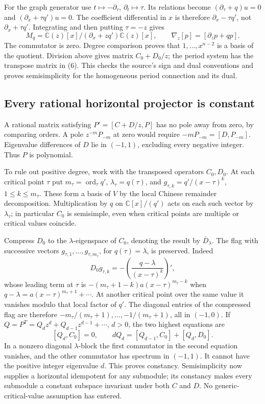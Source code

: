 \documentclass[11pt]{article}
\DeclareMathOperator{\ord}{ord}
\newcommand{\C}{\mathbb C}
\begin{document}
For the graph generator use $t\mapsto-\partial_\tau$,
$\partial_t\mapsto\tau$. Its relations become
$(\partial_\tau+q)u=0$ and $(\partial_x+\tau q')u=0$.
The coefficient differential in $x$ is therefore $\partial_x-\tau q'$,
not $\partial_x+\tau q'$. Integrating and then putting $\tau=-z$ gives
\[
 M_q=\C(z)[x]/(\partial_x+zq')\C(z)[x],\qquad
 \nabla_z[p]=[\partial_zp+qp].                              \tag{7}
\]
The commutator is zero. Degree comparison proves that $1,\ldots,x^{n-2}$
is a basis of the quotient. Division above gives matrix $C_0+D_0/z$;
the period system has the transpose matrix in (6). This checks the
source's sign and dual conventions and proves semisimplicity for the
homogeneous period connection and its dual.

\subsection{Every rational horizontal projector is constant}
A rational matrix satisfying $P'=[C+D/z,P]$ has no pole away from zero,
by comparing orders. A pole $z^{-m}P_{-m}$ at zero would require
$-mP_{-m}=[D,P_{-m}]$. Eigenvalue differences of $D$ lie in $(-1,1)$,
excluding every negative integer. Thus $P$ is polynomial.

To rule out positive degree, work with the transposed operators $C_0,D_0$.
At each critical point $\tau$ put $m_\tau=\ord_\tau q'$,
$\lambda_\tau=q(\tau)$, and $g_{\tau,k}=q'/(x-\tau)^k$,
$1\le k\le m_\tau$. These form a basis of $V$ by the local Chinese
remainder decomposition. Multiplication by $q$ on $\C[x]/(q')$ acts on
each such vector by $\lambda_\tau$; in particular $C_0$ is semisimple,
even when critical points are multiple or critical values coincide.

Compress $D_0$ to the $\lambda$-eigenspace of $C_0$, denoting the result
by $\bar D_\lambda$. The flag with successive vectors
$g_{\tau,1},\ldots,g_{\tau,m_\tau}$, for $q(\tau)=\lambda$, is preserved.
Indeed
\[
 D_0g_{\tau,k}=-\left(\frac{q-\lambda}{(x-\tau)^k}\right)',
\]
whose leading term at $\tau$ is $-(m_\tau+1-k)a(x-\tau)^{m_\tau-k}$
when $q-\lambda=a(x-\tau)^{m_\tau+1}+\cdots$. At another critical point
over the same value it vanishes modulo that local factor of $q'$.
The diagonal entries of the compressed flag are therefore
$-m_\tau/(m_\tau+1),\ldots,-1/(m_\tau+1)$, all in $(-1,0)$.
If $Q=P^T=Q_dz^d+Q_{d-1}z^{d-1}+\cdots$, $d>0$, the two highest equations are
\[
 [Q_d,C_0]=0,\qquad
 dQ_d=[Q_{d-1},C_0]+[Q_d,D_0].                              \tag{8}
\]
In a nonzero diagonal $\lambda$-block the first commutator in the second
equation vanishes, and the other commutator has spectrum in $(-1,1)$.
It cannot have the positive integer eigenvalue $d$. This proves constancy.
Semisimplicity now supplies a horizontal idempotent for any submodule;
its constancy makes every submodule a constant subspace invariant under
both $C$ and $D$. No generic-critical-value assumption has entered.
\end{document}
